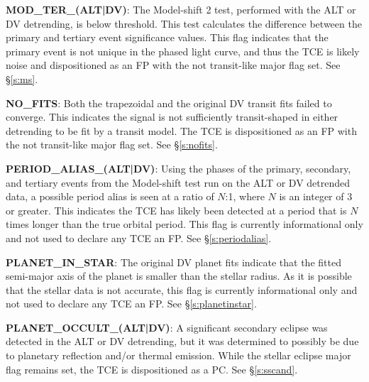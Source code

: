 \textbf{MOD\_TER\_(ALT|DV)}: The Model-shift 2 test, performed with the ALT or DV detrending, is below threshold. This test calculates the difference between the primary and tertiary event significance values. This flag indicates that the primary event is not unique in the phased light curve, and thus the TCE is likely noise and dispositioned as an FP with the not transit-like major flag set. See \S\ref{s:ms}.


\textbf{NO\_FITS}: Both the trapezoidal and the original DV transit fits failed to converge. This indicates the signal is not sufficiently transit-shaped in either detrending to be fit by a transit model. The TCE is dispositioned as an FP with the not transit-like major flag set. See \S\ref{s:nofits}.

\textbf{PERIOD\_ALIAS\_(ALT|DV)}: Using the phases of the primary, secondary, and tertiary events from the Model-shift test run on the ALT or DV detrended data, a possible period alias is seen at a ratio of $N$:1, where $N$ is an integer of 3 or greater. This indicates the TCE has likely been detected at a period that is $N$ times longer than the true orbital period. This flag is currently informational only and not used to declare any TCE an FP. See \S\ref{s:periodalias}.


\textbf{PLANET\_IN\_STAR}: The original DV planet fits indicate that the fitted semi-major axis of the planet is smaller than the stellar radius. As it is possible that the stellar data is not accurate, this flag is currently informational only and not used to declare any TCE an FP. See \S\ref{s:planetinstar}.

\textbf{PLANET\_OCCULT\_(ALT|DV)}: A significant secondary eclipse was detected in the ALT or DV detrending, but it was determined to possibly be due to planetary reflection and/or thermal emission. While the stellar eclipse major flag remains set, the TCE is dispositioned as a PC. See \S\ref{s:sscand}.

